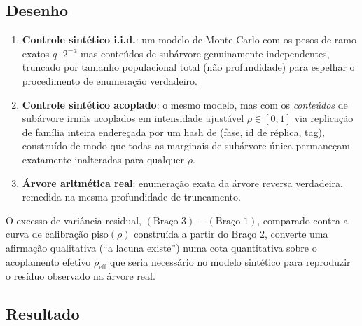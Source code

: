 \documentclass[11pt]{article}
\theoremstyle{definition}
\theoremstyle{remark}
\begin{document}
\subsection{Desenho}

\begin{enumerate}[label=Braço~\arabic*.]
\item \textbf{Controle sintético i.i.d.}: um modelo de Monte Carlo com
  os pesos de ramo exatos $q\cdot 2^{-a}$ mas conteúdos de subárvore
  genuinamente independentes, truncado por tamanho populacional total
  (não profundidade) para espelhar o procedimento de enumeração
  verdadeiro.
\item \textbf{Controle sintético acoplado}: o mesmo modelo, mas com os
  \emph{conteúdos} de subárvore irmãs acoplados em intensidade
  ajustável $\rho\in[0,1]$ via replicação de família inteira endereçada
  por um hash de (fase, id de réplica, tag), construído de modo que
  todas as marginais de subárvore única permaneçam exatamente
  inalteradas para qualquer $\rho$.
\item \textbf{Árvore aritmética real}: enumeração exata da árvore
  reversa verdadeira, remedida na mesma profundidade de truncamento.
\end{enumerate}

O excesso de variância residual, $(\text{Braço 3}) - (\text{Braço 1})$,
comparado contra a curva de calibração $\text{piso}(\rho)$ construída
a partir do Braço 2, converte uma afirmação qualitativa (``a lacuna
existe'') numa cota quantitativa sobre o acoplamento efetivo
$\rho_{\mathrm{eff}}$ que seria necessário no modelo sintético para
reproduzir o resíduo observado na árvore real.

\subsection{Resultado}
\end{document}
